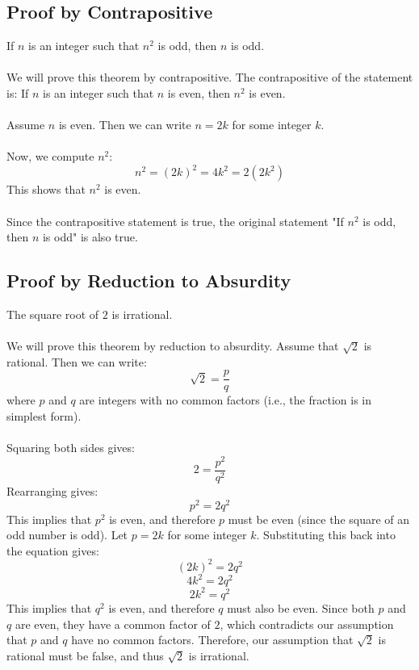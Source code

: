 \subsection{Proof by Contrapositive}

If \( n \) is an integer such that \( n^2 \) is odd, then \( n \) is odd.
\\\\
	We will prove this theorem by contrapositive. The contrapositive of the statement is: If \( n \) is an integer such that \( n \) is even, then \( n^2 \) is even.
\\\\
	Assume \( n \) is even. Then we can write \( n = 2k \) for some integer \( k \).
\\\\
	Now, we compute \( n^2 \):
	\[
		n^2 = {(2k)}^2 = 4k^2 = 2(2k^2)
	\]
	This shows that \( n^2 \) is even.
\\\\
	Since the contrapositive statement is true, the original statement "If \( n^2 \) is odd, then \( n \) is odd" is also true.
\QED

\subsection{Proof by Reduction to Absurdity}

The square root of \( 2 \) is irrational.
\\\\
	We will prove this theorem by reduction to absurdity. Assume that \( \sqrt{2} \) is rational. Then we can write:
	\[
		\sqrt{2} = \frac{p}{q}
	\]
	where \( p \) and \( q \) are integers with no common factors (i.e., the fraction is in simplest form).
\\\\
	Squaring both sides gives:
	\[
		2 = \frac{p^2}{q^2}
	\]
	Rearranging gives:
	\[
		p^2 = 2q^2
	\]
	This implies that \( p^2 \) is even, and therefore \( p \) must be even (since the square of an odd number is odd).
	Let \( p = 2k \) for some integer \( k \). Substituting this back into the equation gives:
	\[
		{(2k)}^2 = 2q^2
	\]
	\[
		4k^2 = 2q^2
	\]
	\[
		2k^2 = q^2
	\]
	This implies that \( q^2 \) is even, and therefore \( q \) must also be even.
	Since both \( p \) and \( q \) are even, they have a common factor of \( 2 \), which contradicts our assumption that \( p \) and \( q \) have no common factors.
	Therefore, our assumption that \( \sqrt{2} \) is rational must be false, and thus \( \sqrt{2} \) is irrational.

